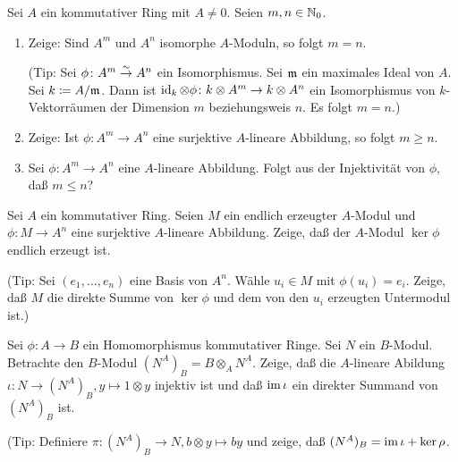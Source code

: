 \begin{exercise}
	Sei \(A\) ein kommutativer Ring mit \(A \neq 0\). Seien \(m, n \in \mathbb N_0\).
	\begin{enumerate}
	\item
		Zeige:
		Sind \(A^m\) und \(A^n\) isomorphe \(A\)-Moduln, so folgt \(m = n\).
		
		(Tip: Sei \(\phi\colon A^m \stackrel\sim\to A^n\) ein Isomorphismus. Sei \(\mathfrak{m}\) ein maximales Ideal von \(A\). Sei
		\(k \coloneqq A/\mathfrak{m}\). Dann ist \(\operatorname{id}_k \otimes \phi\colon k \otimes A^m \to k \otimes A^n\) ein Isomorphismus
		von \(k\)-Vektorräumen der Dimension \(m\) beziehungsweis \(n\). Es folgt \(m = n\).)
	\item
		Zeige:
		Ist \(\phi\colon A^m \to A^n\) eine surjektive \(A\)-lineare Abbildung, so folgt \(m \ge n\).
	\item
		Sei \(\phi\colon A^m \to A^n\) eine \(A\)-lineare Abbildung. Folgt aus der Injektivität von \(\phi\), daß
		\(m \le n\)?
	\end{enumerate}
\end{exercise}

\begin{exercise}
	\label{exer:fg_ker_map_to_free}
	Sei \(A\) ein kommutativer Ring.
	Seien \(M\) ein endlich erzeugter \(A\)-Modul und \(\phi\colon M \to A^n\) eine surjektive \(A\)-lineare Abbildung.
	Zeige, daß der \(A\)-Modul \(\ker \phi\) endlich erzeugt ist.
	
	(Tip: Sei \((e_1, \dotsc, e_n)\) eine Basis von \(A^n\). Wähle \(u_i \in M\) mit \(\phi(u_i) = e_i\). Zeige, daß
	\(M\) die direkte Summe von \(\ker \phi\) und dem von den \(u_i\) erzeugten Untermodul ist.)
\end{exercise}

\begin{exercise}
	Sei \(\phi\colon A \to B\) ein Homomorphismus kommutativer Ringe. Sei \(N\) ein \(B\)-Modul. Betrachte den
	\(B\)-Modul \((N^A)_B = B \otimes_A N^A\). Zeige, daß die \(A\)-lineare Abildung \(\iota\colon
	N \to (N^A)_B, y \mapsto 1 \otimes y\) injektiv ist und daß \(\operatorname{im} \iota\) ein direkter Summand von \((N^A)_B\) ist.
	
	(Tip: Definiere \(\pi\colon (N^A)_B \to N, b \otimes y \mapsto by\) und zeige, daß \((N^A)_B = \operatorname{im} \iota + \ker \rho\).
\end{exercise}

